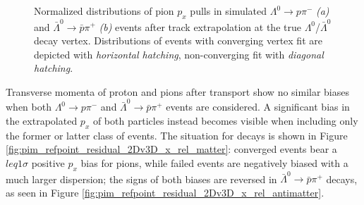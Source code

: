 \begin{figure}[t]
\begin{subfigure}{.45\textwidth}
		\caption{}
		\label{fig:pim_momentum_residual_2Dv3D_x_rel_antimatter}
	\end{subfigure}
	\caption{Normalized distributions of pion $p_x$ pulls in simulated $\Lambda^0 \rightarrow p\pi^-$ \textit{(a)} and $\bar{\Lambda}^0 \rightarrow \bar{p}\pi^+$ \textit{(b)} events after track extrapolation at the true $\Lambda^0$/$\bar{\Lambda}^0$ decay vertex.
	Distributions of events with converging vertex fit are depicted with \textit{horizontal hatching}, non-converging fit with \textit{diagonal hatching}.}
	\label{fig:3:pim_momentum_residual_2Dv3D_x_rel}
\end{figure}

Transverse momenta of proton and pions after transport show no similar biases when both $\Lambda^0 \rightarrow p\pi^-$ and $\bar{\Lambda}^0 \rightarrow \bar{p}\pi^+$ events are considered.
A significant bias in the extrapolated $p_x$ of both particles instead becomes visible when including only the former or latter class of events.
The situation for \lz decays is shown in Figure \ref{fig:pim_refpoint_residual_2Dv3D_x_rel_matter}:
converged events bear a $leq 1\sigma$ positive $p_x$ bias for pions, while failed events are negatively biased with a much larger dispersion; the signs of both biases are reversed 
in $\bar{\Lambda}^0 \rightarrow \bar{p}\pi^+$ decays, as seen in Figure \ref{fig:pim_refpoint_residual_2Dv3D_x_rel_antimatter}.

